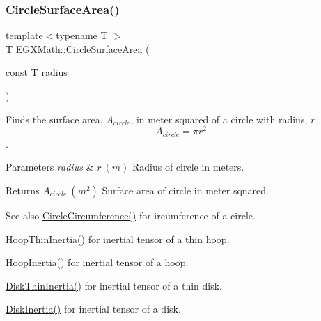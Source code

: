 \subsubsection{\texorpdfstring{Circle\+Surface\+Area()}{CircleSurfaceArea()}}
{\footnotesize\ttfamily template$<$typename T $>$ \\
T E\+G\+X\+Math\+::\+Circle\+Surface\+Area (\begin{DoxyParamCaption}\item[{const T}]{radius }\end{DoxyParamCaption})}



Finds the surface area, $A_{circle}$, in meter squared of a circle with radius, $r$ \[ A_{circle}=\pi r^2 \]. 


\begin{DoxyParams}{Parameters}
{\em radius} & $ r\ (m)$ Radius of circle in meters. \\
\hline
\end{DoxyParams}
\begin{DoxyReturn}{Returns}
$ A_{circle}\ (m^2)$ Surface area of circle in meter squared. 
\end{DoxyReturn}
\begin{DoxySeeAlso}{See also}
\mbox{\hyperlink{group___e_g_x_math-_geometry-2_d-_circle_gadb55695b75a06a3f3534494eb767e18e}{Circle\+Circumference()}} for ircumference of a circle. 

\mbox{\hyperlink{group___e_g_x_math-_geometry-3_d-_hoop_gab3a84dc2aa29ce0db990425747d291c6}{Hoop\+Thin\+Inertia()}} for inertial tensor of a thin hoop. 

Hoop\+Inertia() for inertial tensor of a hoop. 

\mbox{\hyperlink{group___e_g_x_math-_geometry-3_d-_disk_ga8dcadf6cd5680294a84311c6767e3caf}{Disk\+Thin\+Inertia()}} for inertial tensor of a thin disk. 

\mbox{\hyperlink{group___e_g_x_math-_geometry-3_d-_disk_ga6ed461694b277e36a641a6550bdea68f}{Disk\+Inertia()}} for inertial tensor of a disk. 
\end{DoxySeeAlso}
